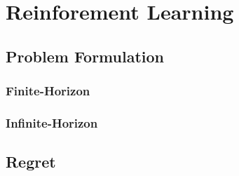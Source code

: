 \chapter{Reinforement Learning}
\label{ch:rl_finite_horizon}

\section{Problem Formulation}

\subsection{Finite-Horizon}


\subsection{Infinite-Horizon}


    \section{Regret}
    \label{sec:regret}
    
